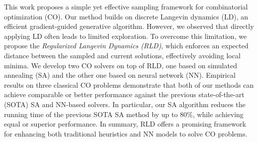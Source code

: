 
This work proposes a simple yet effective sampling framework for combinatorial optimization (CO). Our method builds on discrete Langevin dynamics (LD), an efficient gradient-guided generative algorithm. However, we observed that directly applying LD often leads to limited exploration. To overcome this limitation, we propose the \textit{Regularized Langevin Dynamics (RLD)}, which enforces an expected distance between the sampled and current solutions, effectively avoiding local minima. We develop two CO solvers on top of RLD, one based on simulated annealing (SA) and the other one based on neural network (NN). Empirical results on three classical CO problems demonstrate that both of our methods can achieve comparable or better performance against the previous state-of-the-art (SOTA) SA and NN-based solvers. In particular, our SA algorithm reduces the running time of the previous SOTA SA method by up to 80\%, while achieving equal or superior performance. In summary, RLD offers a promising framework for enhancing both traditional heuristics and NN models to solve CO problems.
